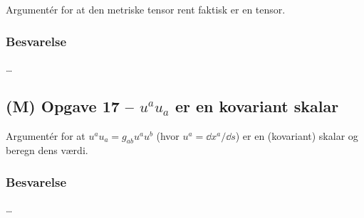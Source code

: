 \documentclass[../main.tex]{subfiles}
\begin{document}
Argumentér for at den metriske tensor rent faktisk er en tensor.


\subsubsection{Besvarelse}

\ldots




\subsection{(M) Opgave 17 -- $u^a u_a$ er en kovariant skalar}
\setcounter{subsection}{17}
\setcounter{equation}{0}

Argumentér for at $u^a u_a = g_{ab} u^a u^b$ (hvor $u^a = \dd x^a / \dd s$) er en (kovariant) skalar og beregn dens værdi.


\subsubsection{Besvarelse}

\ldots



\end{document}
